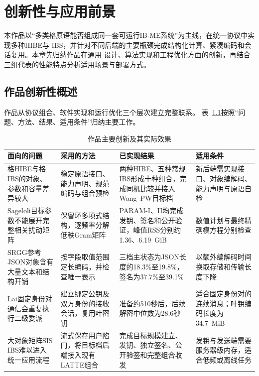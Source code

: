 \chapter{创新性与应用前景}

本作品以“多类格原语能否组成同一套可运行IB-ME系统”为主线，在统一协议中实现多种HIBE与
IBS，并针对不同后端的主要瓶颈完成结构化计算、紧凑编码和会话复用。本章先归纳作品在通用
设计、算法实现和工程优化方面的创新，再结合三组代表的性能特点分析适用场景与部署方式。

\section{作品创新性概述}

作品从协议组合、软件实现和运行优化三个层次建立完整联系。
表~\ref{tab:innovation-summary}按照“问题、方法、结果、适用条件”归纳主要工作。

\begin{table}[H]
\centering\small
\caption{作品主要创新及其实际效果}
\label{tab:innovation-summary}
\begin{tabularx}{\textwidth}{@{}>{\raggedright\arraybackslash}p{}>{\raggedright\arraybackslash}p{}>{\raggedright\arraybackslash}p{}>{\raggedright\arraybackslash}X@{}}
\toprule
\rowcolor{black!8} 面向的问题 & 采用的方法 & 已实现结果 & 适用条件 \\
\midrule
格HIBE与格IBS的对象、参数和容量差异较大
& 稳定原语接口、能力声明、规范编码与组合预检
& 两种HIBE、五种常规IBS形成十种组合，完成同机比较并接入Wang--PW目标档
& 新后端需实现接口、对象编解码、能力声明与原语自检 \\

Sageloli目标参数不能展开完整相关扰动矩阵
& 保留环多项式结构，逐频率分解低秩Gram矩阵
& PARAM-I、II均完成发钥、签名和公开验证，峰值RSS分别约1.36、6.19~GiB
& 数值计划与最终精确模方程分别检查 \\

SRGG参考JSON对象含有大量文本和结构开销
& 按字段取值范围定长编码，并检查唯一表示
& 三档主状态为JSON长度的18.3\%至19.8\%，签名为37.7\%至39.1\%
& 以额外编解码时间换取存储和传输长度下降 \\

Lai固定身份对通信会重复执行二级委派
& 建立绑定公钥及双方身份的接收会话，复用叶密钥
& 准备约510秒后，后续解密中位数为28.6秒
& 适合固定身份对的连续消息；叶钥编码长度为34.7~MiB \\

大对象矩阵SIS IBS难以进入统一应用流程
& 流式保存用户陷门，将目标档后端接入现有LATTE组合
& 完成目标规模建立、发钥、独立签名、公开验签和完整组合收发
& 发钥与发送端需要服务器级内存，适合低频或离线任务 \\
\bottomrule
\end{tabularx}
\end{table}

